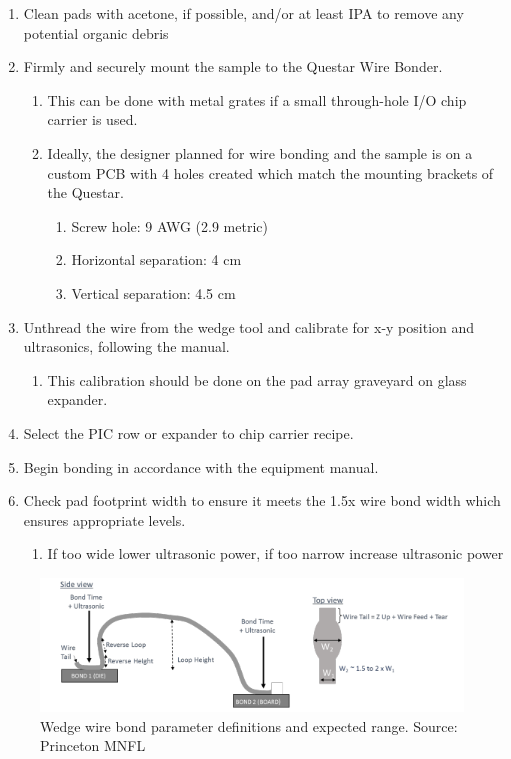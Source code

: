 \begin{enumerate}
    \item Clean pads with acetone, if possible, and/or at least IPA to remove any potential organic debris
    \item Firmly and securely mount the sample to the Questar Wire Bonder.
    \begin{enumerate}
        \item This can be done with metal grates if a small through-hole I/O chip carrier is used.
        \item Ideally, the designer planned for wire bonding and the sample is on a custom PCB with 4 holes created which match the mounting brackets of the Questar.
        \begin{enumerate}
            \item Screw hole: 9 AWG (2.9 metric)
            \item Horizontal separation: 4 cm
            \item Vertical separation: 4.5 cm
        \end{enumerate}
    \end{enumerate}
    \item Unthread the wire from the wedge tool and calibrate for x-y position and ultrasonics, following the manual.
    \begin{enumerate}
        \item This calibration should be done on the pad array graveyard on glass expander.
    \end{enumerate}
    \item Select the PIC row or expander to chip carrier recipe. 
    \item Begin bonding in accordance with the equipment manual. 
    \item Check pad footprint width to ensure it meets the 1.5x wire bond width which ensures appropriate levels.
    \begin{enumerate}
        \item If too wide lower ultrasonic power, if too narrow increase ultrasonic power
    \end{enumerate}
\end{enumerate}

\begin{figure}[!ht]
\centering
\includegraphics[width=5in]{./Figures/AppendixA/FigAppA15.png}
\caption{Wedge wire bond parameter definitions and expected range. Source: Princeton MNFL  }
\label{FigAppA15}
\end{figure}

